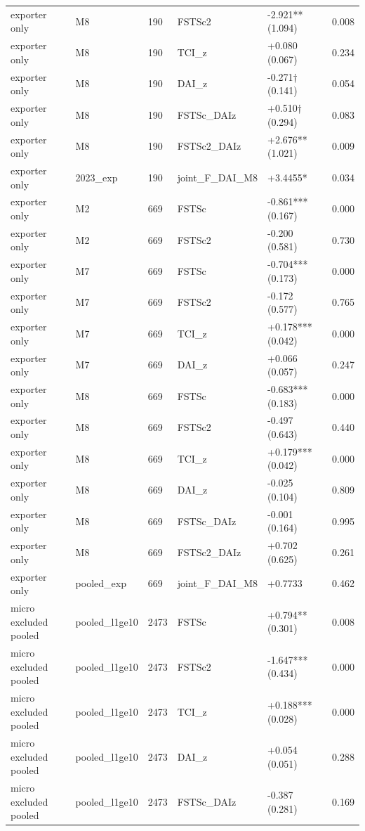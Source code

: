 \documentclass[12pt,a4paper]{article}
\begin{document}
\begin{longtable}[]{@{}llllll@{}}
exporter only & M8 & 190 & FSTSc2 & -2.921** (1.094) & 0.008 \\
exporter only & M8 & 190 & TCI\_z & +0.080 (0.067) & 0.234 \\
exporter only & M8 & 190 & DAI\_z & -0.271† (0.141) & 0.054 \\
exporter only & M8 & 190 & FSTSc\_DAIz & +0.510† (0.294) & 0.083 \\
exporter only & M8 & 190 & FSTSc2\_DAIz & +2.676** (1.021) & 0.009 \\
exporter only & 2023\_exp & 190 & joint\_F\_DAI\_M8 & +3.4455* &
0.034 \\
exporter only & M2 & 669 & FSTSc & -0.861*** (0.167) & 0.000 \\
exporter only & M2 & 669 & FSTSc2 & -0.200 (0.581) & 0.730 \\
exporter only & M7 & 669 & FSTSc & -0.704*** (0.173) & 0.000 \\
exporter only & M7 & 669 & FSTSc2 & -0.172 (0.577) & 0.765 \\
exporter only & M7 & 669 & TCI\_z & +0.178*** (0.042) & 0.000 \\
exporter only & M7 & 669 & DAI\_z & +0.066 (0.057) & 0.247 \\
exporter only & M8 & 669 & FSTSc & -0.683*** (0.183) & 0.000 \\
exporter only & M8 & 669 & FSTSc2 & -0.497 (0.643) & 0.440 \\
exporter only & M8 & 669 & TCI\_z & +0.179*** (0.042) & 0.000 \\
exporter only & M8 & 669 & DAI\_z & -0.025 (0.104) & 0.809 \\
exporter only & M8 & 669 & FSTSc\_DAIz & -0.001 (0.164) & 0.995 \\
exporter only & M8 & 669 & FSTSc2\_DAIz & +0.702 (0.625) & 0.261 \\
exporter only & pooled\_exp & 669 & joint\_F\_DAI\_M8 & +0.7733 &
0.462 \\
micro excluded pooled & pooled\_l1ge10 & 2473 & FSTSc & +0.794** (0.301)
& 0.008 \\
micro excluded pooled & pooled\_l1ge10 & 2473 & FSTSc2 & -1.647***
(0.434) & 0.000 \\
micro excluded pooled & pooled\_l1ge10 & 2473 & TCI\_z & +0.188***
(0.028) & 0.000 \\
micro excluded pooled & pooled\_l1ge10 & 2473 & DAI\_z & +0.054 (0.051)
& 0.288 \\
micro excluded pooled & pooled\_l1ge10 & 2473 & FSTSc\_DAIz & -0.387
(0.281) & 0.169 \\

\end{longtable}
\end{document}
